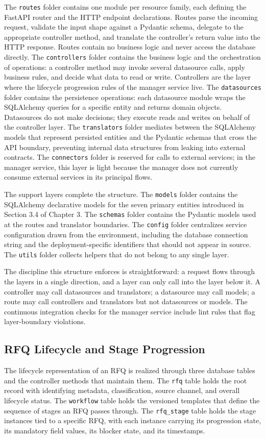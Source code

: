 The \texttt{routes} folder contains one module per resource family, each defining the FastAPI router and the HTTP endpoint declarations. Routes parse the incoming request, validate the input shape against a Pydantic schema, delegate to the appropriate controller method, and translate the controller's return value into the HTTP response. Routes contain no business logic and never access the database directly. The \texttt{controllers} folder contains the business logic and the orchestration of operations: a controller method may invoke several datasource calls, apply business rules, and decide what data to read or write. Controllers are the layer where the lifecycle progression rules of the manager service live. The \texttt{datasources} folder contains the persistence operations: each datasource module wraps the SQLAlchemy queries for a specific entity and returns domain objects. Datasources do not make decisions; they execute reads and writes on behalf of the controller layer. The \texttt{translators} folder mediates between the SQLAlchemy models that represent persisted entities and the Pydantic schemas that cross the API boundary, preventing internal data structures from leaking into external contracts. The \texttt{connectors} folder is reserved for calls to external services; in the manager service, this layer is light because the manager does not currently consume external services in its principal flows.

The support layers complete the structure. The \texttt{models} folder contains the SQLAlchemy declarative models for the seven primary entities introduced in Section 3.4 of Chapter 3. The \texttt{schemas} folder contains the Pydantic models used at the routes and translator boundaries. The \texttt{config} folder centralizes service configuration drawn from the environment, including the database connection string and the deployment-specific identifiers that should not appear in source. The \texttt{utils} folder collects helpers that do not belong to any single layer.

The discipline this structure enforces is straightforward: a request flows through the layers in a single direction, and a layer can only call into the layer below it. A controller may call datasources and translators; a datasource may call models; a route may call controllers and translators but not datasources or models. The continuous integration checks for the manager service include lint rules that flag layer-boundary violations.

\subsection{RFQ Lifecycle and Stage Progression}
The lifecycle representation of an RFQ is realized through three database tables and the controller methods that maintain them. The \texttt{rfq} table holds the root record with identifying metadata, classification, source channel, and overall lifecycle status. The \texttt{workflow} table holds the versioned templates that define the sequence of stages an RFQ passes through. The \texttt{rfq\_stage} table holds the stage instances tied to a specific RFQ, with each instance carrying its progression state, its mandatory field values, its blocker state, and its timestamps.

